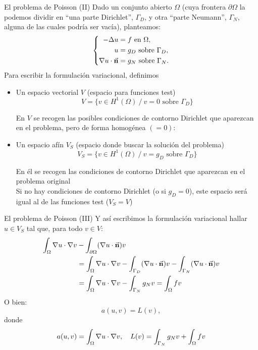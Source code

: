 \documentclass[9pt, dvipsnames]{beamer}
\begin{document}
\begin{frame}{El problema de Poisson (II)}
  Dado un conjunto abierto $\Omega$ (cuya frontera $\partial\Omega$ la
  podemos dividir en ``una parte Dirichlet'', $\Gamma_D$, y otra
  ``parte Neumann'', $\Gamma_N$, alguna de las cuales podría ser
  vacía), planteamos:
  \begin{equation*}
    \left\{
    \begin{aligned}
      -\Delta u &= f \text{ en } \Omega, \\
      u&=g_D \text{ sobre } \Gamma_D, \\
      \nabla u \cdot \vec{\mathbf{n}} &=g_N \text{ sobre } \Gamma_N.
    \end{aligned}
    \right.
  \end{equation*}
  Para escribir la formulación variacional, definimos
  \begin{itemize}
  \item Un espacio vectorial $V$ (espacio para funciones test)
    $$ V = \{ v\in H^1(\Omega) \ / \ v=0 \text{ sobre } {\Gamma_D} \}$$
    \begin{flushright}\small
    En $V$ se recogen las posibles condiciones de contorno
      Dirichlet que aparezcan en el problema, pero de forma homogénea
      $(=0)$:
    \end{flushright}
\item Un espacio afín $V_{S}$ (espacio donde buscar la solución del problema)
    $$ V_S = \{ v\in H^1(\Omega) \ / \ v=g_D \text{ sobre } {\Gamma_D} \}$$
    \begin{flushright}\small
      En él se recogen las condiciones de contorno Dirichlet que
      aparezcan en el problema original
      \\
      Si no hay condiciones de contorno Dirichlet (o si $g_D=0$), este
      espacio será igual al de las funciones test ($V_S=V$)
    \end{flushright}
  \end{itemize}
\end{frame}

\begin{frame}{El problema de Poisson (III)}
  Y así escribimos la formulación variacional hallar $u\in V_S$ tal
  que, para todo $v\in V$:
  \begin{align*}
      \int_\Omega \nabla u \cdot \nabla v
      &- \int_{\partial\Omega} (\nabla u \cdot \vec{\mathbf{n}}) v
      \\
      &=\int_\Omega \nabla u \cdot \nabla v
      - \int_{\Gamma_D} (\nabla u \cdot \vec{\mathbf{n}}) v
      - \int_{\Gamma_N} (\nabla u \cdot \vec{\mathbf{n}}) v
      \\
      &=\int_\Omega \nabla u \cdot \nabla v
      - \int_{\Gamma_N} g_N v
      = \int_\Omega  f v
    \end{align*}
    O bien:
    $$
    a(u,v) = L(v),
    $$
    donde
    \begin{equation*}
      a(u,v)=\int_\Omega \nabla u \cdot \nabla v,
      \quad
      L(v)=  \int_{\Gamma_N} g_N v + \int_\Omega  f v
    \end{equation*}
\end{frame}
\end{document}
